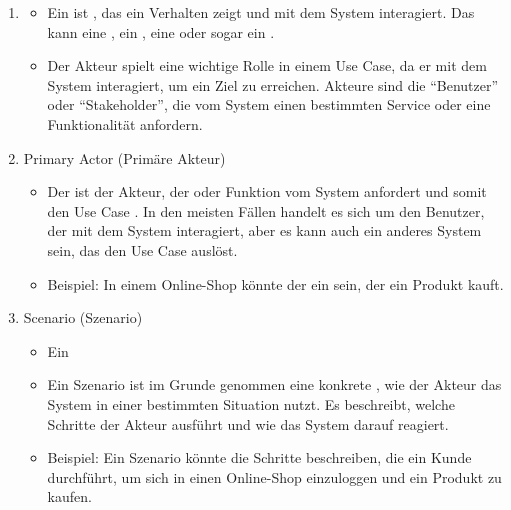 \begin{infoBox}
    \begin{enumerate}
        \item {}
        \begin{itemize}
            \item Ein  ist , das ein Verhalten zeigt und mit dem System interagiert. Das kann eine , ein , eine  oder sogar ein .
            \item Der Akteur spielt eine wichtige Rolle in einem Use Case, da er mit dem System interagiert, um ein Ziel zu erreichen. Akteure sind die \enquote{Benutzer} oder \enquote{Stakeholder}, die vom System einen bestimmten Service oder eine Funktionalität anfordern.
        \end{itemize}
        \item Primary Actor (Primäre Akteur)
        \begin{itemize}
            \item Der  ist der Akteur, der  oder Funktion vom System anfordert und somit den Use Case . In den meisten Fällen handelt es sich um den Benutzer, der mit dem System interagiert, aber es kann auch ein anderes System sein, das den Use Case auslöst.
            \item Beispiel: In einem Online-Shop könnte der  ein  sein, der ein Produkt kauft.
        \end{itemize}
        \item Scenario (Szenario)
        \begin{itemize}
            \item Ein 
            \item Ein Szenario ist im Grunde genommen eine konkrete , wie der Akteur das System in einer bestimmten Situation nutzt. Es beschreibt, welche Schritte der Akteur ausführt und wie das System darauf reagiert.
            \item Beispiel: Ein Szenario könnte die Schritte beschreiben, die ein Kunde durchführt, um sich in einen Online-Shop einzuloggen und ein Produkt zu kaufen.

\end{itemize}
\end{enumerate}
\end{infoBox}
